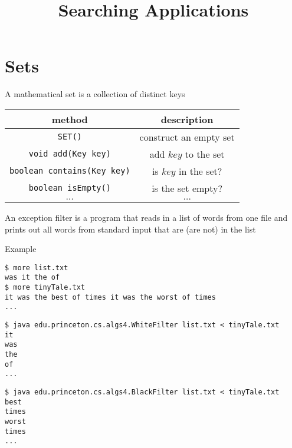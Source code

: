 \documentclass[8pt,a4paper,compress]{beamer}
\title{Searching Applications}
\date{}
\begin{document}
\begin{frame}
\vfill
\titlepage
\end{frame}

\section{Sets}
\begin{frame}[fragile]
\pause

A mathematical set is a collection of distinct keys
\begin{center}
\begin{tabular}{cc}
method & description \\ \hline
\lstinline$SET()$ & construct an empty set \\
\lstinline$void add(Key key)$ & add $key$ to the set \\
\lstinline$boolean contains(Key key)$ & is $key$ in the set? \\
\lstinline$boolean isEmpty()$ & is the set empty? \\
$\dots$ & $\dots$
\end{tabular}
\end{center}

\pause
\bigskip

An exception filter is a program that reads in a list of words from one file and prints out all words from standard input that are (are not) in the list

\pause
\bigskip

Example
\begin{lstlisting}[language={}]
$ more list.txt
was it the of
$ more tinyTale.txt
it was the best of times it was the worst of times
...
\end{lstlisting}

\begin{lstlisting}[language={}]
$ java edu.princeton.cs.algs4.WhiteFilter list.txt < tinyTale.txt 
it 
was 
the 
of 
...
\end{lstlisting}

\begin{lstlisting}[language={}]
$ java edu.princeton.cs.algs4.BlackFilter list.txt < tinyTale.txt
best 
times 
worst 
times
...
\end{lstlisting}
\end{frame}
\end{document}
